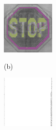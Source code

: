 \documentclass{article}
\begin{document}
\begin{figure}[!b]
\begin{minipage}[c]{.21\linewidth}
  \end{minipage}
  \begin{minipage}[c]{.21\linewidth}
    \centering\centerline{\includegraphics[width=\linewidth]{imgs/dennis_cal/stop/products/497.png}}
  \end{minipage}
  \begin{minipage}[c]{.1\linewidth}
    \centering\centerline{(b)}
  \end{minipage}
  \begin{minipage}[c]{.21\linewidth}
    \centering\centerline{\includegraphics[width=\linewidth]{imgs/dennis_cal/airplane/sums/497_994.png}}

\end{minipage}
\end{figure}
\end{document}
